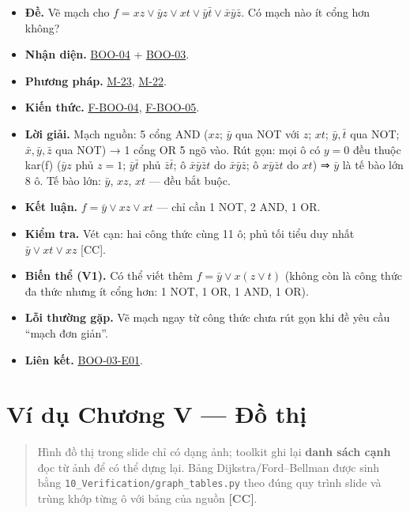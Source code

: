 \documentclass[
  10pt,
  twoside,openany]{book}
\providecommand{\tightlist}{%
  \setlength{\itemsep}{0pt}\setlength{\parskip}{0pt}}
\begin{document}
\begin{itemize}
\tightlist
\item
  \textbf{Đề.} Vẽ mạch cho
  \(f=xz\vee\bar yz\vee xt\vee\bar y\bar t\vee\bar x\bar y\bar z\). Có
  mạch nào ít cổng hơn không?
\item
  \textbf{Nhận diện.} \protect\hyperlink{BOO-04}{BOO-04} +
  \protect\hyperlink{BOO-03}{BOO-03}.
\item
  \textbf{Phương pháp.} \protect\hyperlink{M-23}{M-23},
  \protect\hyperlink{M-22}{M-22}.
\item
  \textbf{Kiến thức.} \protect\hyperlink{F-BOO-04}{F-BOO-04},
  \protect\hyperlink{F-BOO-05}{F-BOO-05}.
\item
  \textbf{Lời giải.} Mạch nguồn: 5 cổng AND (\(xz\); \(\bar y\) qua NOT
  với \(z\); \(xt\); \(\bar y,\bar t\) qua NOT; \(\bar x,\bar y,\bar z\)
  qua NOT) → 1 cổng OR 5 ngõ vào. Rút gọn: mọi ô có \(y=0\) đều thuộc
  kar(f) (\(\bar yz\) phủ \(z=1\); \(\bar y\bar t\) phủ
  \(\bar z\bar t\); ô \(\bar x\bar y\bar zt\) do \(\bar x\bar y\bar z\);
  ô \(x\bar y\bar zt\) do \(xt\)) ⇒ \(\bar y\) là tế bào lớn 8 ô. Tế bào
  lớn: \(\bar y\), \(xz\), \(xt\) --- đều bắt buộc.
\item
  \textbf{Kết luận.} \(f=\bar y\vee xz\vee xt\) --- chỉ cần 1 NOT, 2
  AND, 1 OR.
\item
  \textbf{Kiểm tra.} Vét cạn: hai công thức cùng 11 ô; phủ tối tiểu duy
  nhất \(\bar y\vee xt\vee xz\) {[}CC{]}.
\item
  \textbf{Biến thể (V1).} Có thể viết thêm \(f=\bar y\vee x(z\vee t)\)
  (không còn là công thức đa thức nhưng ít cổng hơn: 1 NOT, 1 OR, 1 AND,
  1 OR).
\item
  \textbf{Lỗi thường gặp.} Vẽ mạch ngay từ công thức chưa rút gọn khi đề
  yêu cầu ``mạch đơn giản''.
\item
  \textbf{Liên kết.} \protect\hyperlink{BOO-03-E01}{BOO-03-E01}.
\end{itemize}

\hypertarget{ex-ch5}{%
\chapter{Ví dụ Chương V --- Đồ thị}\label{ex-ch5}}

\begin{quote}
Hình đồ thị trong slide chỉ có dạng ảnh; toolkit ghi lại \textbf{danh
sách cạnh} đọc từ ảnh để có thể dựng lại. Bảng Dijkstra/Ford--Bellman
được sinh bằng \texttt{10\_Verification/graph\_tables.py} theo đúng quy
trình slide và trùng khớp từng ô với bảng của nguồn \textbf{{[}CC{]}}.
\end{quote}
\end{document}
